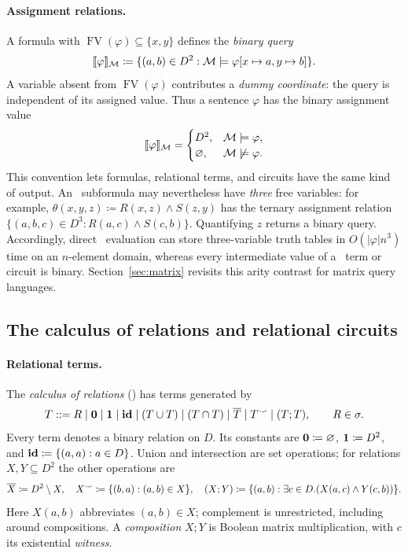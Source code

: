 \paragraph{Assignment relations.}
A formula with $\operatorname{FV}(\varphi)\subseteq\{x,y\}$ defines the
\emph{binary query}
\[
 \llbracket \varphi\rrbracket_{\mathcal M}
 \coloneqq\{(a,b)\in D^2:\mathcal M\models
       \varphi[x\mapsto a,y\mapsto b]\}.
\]
A variable absent from $\operatorname{FV}(\varphi)$ contributes a
\emph{dummy coordinate}: the query is independent of its assigned value.
Thus a sentence $\varphi$ has the binary assignment value
\[
 \llbracket \varphi\rrbracket_{\mathcal M}
 =\begin{cases}
     D^2,&\mathcal M\models\varphi,\\
     \varnothing,&\mathcal M\not\models\varphi.
   \end{cases}
\]
This convention lets formulas, relational terms, and circuits have the
same kind of output. An \FOthree\ subformula may nevertheless have
\emph{three} free variables: for example,
$\theta(x,y,z)\coloneqq R(x,z)\land S(z,y)$ has the ternary assignment
relation $\{(a,b,c)\in D^3:R(a,c)\land S(c,b)\}$. Quantifying $z$
returns a binary query. Accordingly, direct \FOthree\ evaluation can
store three-variable truth tables in $O(|\varphi|n^3)$ time on an
$n$-element domain, whereas every intermediate value of a \CoR\ term
or circuit is binary. Section~\ref{sec:matrix} revisits this arity
contrast for matrix query languages.

\subsection{The calculus of relations and relational circuits}\label{sec:prelim-cor}
\paragraph{Relational terms.}
The \emph{calculus of relations} (\CoR) has terms generated by
\[
 T::=R\mid\mathbf{0}\mid\mathbf{1}\mid\mathbf{id}
   \mid(T\cup T)\mid(T\cap T)\mid\overline T
   \mid T^\smile\mid(T;T), \qquad R\in\sigma.
\]
Every term denotes a binary relation on $D$. Its constants are
$\mathbf{0}\coloneqq\varnothing$, $\mathbf{1}\coloneqq D^2$, and
$\mathbf{id}\coloneqq\{(a,a):a\in D\}$. Union and intersection are set operations;
for relations $X,Y\subseteq D^2$ the other operations are
\[
  \overline X \coloneqq D^2\setminus X,\quad
  X^\smile \coloneqq \{ (b,a):(a,b)\in X \},\quad
  (X;Y) \coloneqq 
     \{  (a, b) : \exists c\in D. (X(a,c)\land Y(c,b))  \}.
\]
Here $X(a,b)$ abbreviates $(a,b)\in X$; complement is unrestricted,
including around compositions. A \emph{composition} $X;Y$ is Boolean
matrix multiplication, with $c$ its existential \emph{witness}.

